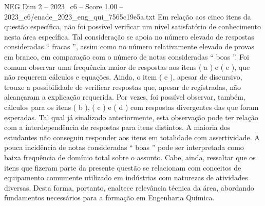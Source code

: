 \begin{textsample}{NEG Dim 2 – 2023\_c6 – Score 1.00 – 2023\_c6/enade\_2023\_eng\_qui\_7565c19e5a.txt}
Em relação aos cinco itens da questão específica, não foi possível verificar um nível satisfatório de conhecimento nesta área específica.
Tal consideração se apoia no número elevado de respostas consideradas “ fracas ”, assim como no número relativamente elevado de provas em branco, em comparação com o número de notas consideradas “ boas ”.
Foi comum observar uma frequência maior de respostas aos itens ( a ) e ( e ), que não requerem cálculos e equações.
Ainda, o item ( e ), apesar de discursivo, trouxe a possibilidade de verificar respostas que, apesar de registradas, não alcançaram a explicação requerida.
Por vezes, foi possível observar, também, cálculos para os itens ( b ), ( c ) e ( d ) com respostas divergentes das que foram esperadas.
Tal qual já sinalizado anteriormente, esta observação pode ter relação com a interdependência de respostas para itens distintos.
A maioria dos estudantes não conseguiu responder aos itens em totalidade com assertividade.
A pouca incidência de notas consideradas “ boas ” pode ser interpretada como baixa frequência de domínio total sobre o assunto.
Cabe, ainda, ressaltar que os itens que fizeram parte da presente questão se relacionam com conceitos de equipamento comumente utilizado em indústrias com naturezas de atividades diversas.
Desta forma, portanto, enaltece relevância técnica da área, abordando fundamentos necessários para a formação em Engenharia Química.

\end{textsample}
